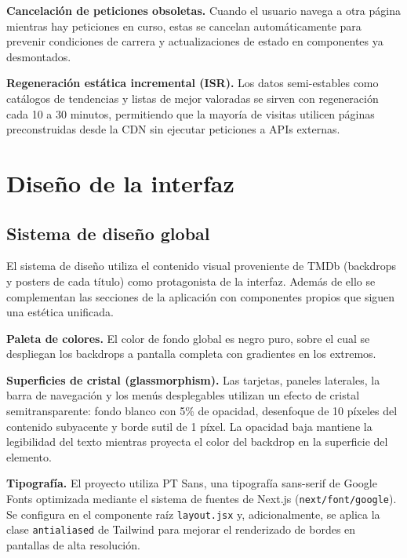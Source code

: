 \textbf{Cancelación de peticiones obsoletas.} Cuando el usuario navega a otra página mientras hay peticiones en curso, estas se cancelan automáticamente para prevenir condiciones de carrera y actualizaciones de estado en componentes ya desmontados.

\textbf{Regeneración estática incremental (ISR).} Los datos semi-estables como catálogos de tendencias y listas de mejor valoradas se sirven con regeneración cada 10 a 30 minutos, permitiendo que la mayoría de visitas utilicen páginas preconstruidas desde la CDN sin ejecutar peticiones a APIs externas.

\section{Diseño de la interfaz}

\subsection{Sistema de diseño global}

El sistema de diseño utiliza el contenido visual proveniente de TMDb (backdrops y posters de cada título) como protagonista de la interfaz. Además de ello se complementan las secciones de la aplicación con componentes propios que siguen una estética unificada.

\textbf{Paleta de colores.} El color de fondo global es negro puro, sobre el cual se despliegan los backdrops a pantalla completa con gradientes en los extremos.

\textbf{Superficies de cristal (glassmorphism).} Las tarjetas, paneles laterales, la barra de navegación y los menús desplegables utilizan un efecto de cristal semitransparente: fondo blanco con 5\% de opacidad, desenfoque de 10 píxeles del contenido subyacente y borde sutil de 1 píxel. La opacidad baja mantiene la legibilidad del texto mientras proyecta el color del backdrop en la superficie del elemento.

\textbf{Tipografía.} El proyecto utiliza PT Sans, una tipografía sans-serif de Google Fonts optimizada mediante el sistema de fuentes de Next.js (\texttt{next/font/google}). Se configura en el componente raíz \texttt{layout.jsx} y, adicionalmente, se aplica la clase \texttt{antialiased} de Tailwind para mejorar el renderizado de bordes en pantallas de alta resolución.

